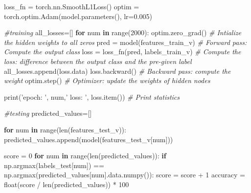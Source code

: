 \documentclass[11pt]{article}
\newenvironment{Shaded}{}{}
\newcommand{\KeywordTok}[1]{\textcolor[rgb]{0.00,0.44,0.13}{\textbf{{#1}}}}
\newcommand{\DecValTok}[1]{\textcolor[rgb]{0.25,0.63,0.44}{{#1}}}
\newcommand{\FloatTok}[1]{\textcolor[rgb]{0.25,0.63,0.44}{{#1}}}
\newcommand{\StringTok}[1]{\textcolor[rgb]{0.25,0.44,0.63}{{#1}}}
\newcommand{\CommentTok}[1]{\textcolor[rgb]{0.38,0.63,0.69}{\textit{{#1}}}}
\newcommand{\NormalTok}[1]{{#1}}
\newcommand{\ControlFlowTok}[1]{\textcolor[rgb]{0.00,0.44,0.13}{\textbf{{#1}}}}
\newcommand{\OperatorTok}[1]{\textcolor[rgb]{0.40,0.40,0.40}{{#1}}}
\newcommand{\BuiltInTok}[1]{{#1}}
\begin{document}
\begin{Shaded}
\begin{Highlighting}[]
\NormalTok{        loss_fn }\OperatorTok{=}\NormalTok{ torch.nn.SmoothL1Loss()}
\NormalTok{        optim }\OperatorTok{=}\NormalTok{ torch.optim.Adam(model.parameters(), lr}\OperatorTok{=}\FloatTok{0.005}\NormalTok{)}
        
        \CommentTok{#training}
\NormalTok{        all_losses}\OperatorTok{=}\NormalTok{[]}
        \ControlFlowTok{for}\NormalTok{ num }\KeywordTok{in} \BuiltInTok{range}\NormalTok{(}\DecValTok{2000}\NormalTok{):}
\NormalTok{            optim.zero_grad()                                 }\CommentTok{# Intialize the hidden weights to all zeros}
\NormalTok{            pred }\OperatorTok{=}\NormalTok{ model(features_train_v)                    }\CommentTok{# Forward pass: Compute the output class}
\NormalTok{            loss }\OperatorTok{=}\NormalTok{ loss_fn(pred, labels_train_v)              }\CommentTok{# Compute the loss: difference between the output class and                                                                      the pre-given label}
\NormalTok{            all_losses.append(loss.data)}
\NormalTok{            loss.backward()                                   }\CommentTok{# Backward pass: compute the weight}
\NormalTok{            optim.step()                                      }\CommentTok{# Optimizer: update the weights of hidden nodes}
            
            \BuiltInTok{print}\NormalTok{(}\StringTok{'epoch: '}\NormalTok{, num,}\StringTok{' loss: '}\NormalTok{, loss.item())      }\CommentTok{# Print statistics       }
            
        \CommentTok{#testing}
\NormalTok{        predicted_values}\OperatorTok{=}\NormalTok{[]}
    
        \ControlFlowTok{for}\NormalTok{ num }\KeywordTok{in} \BuiltInTok{range}\NormalTok{(}\BuiltInTok{len}\NormalTok{(features_test_v)):}
\NormalTok{            predicted_values.append(model(features_test_v[num]))}
        
\NormalTok{        score }\OperatorTok{=} \DecValTok{0}
        \ControlFlowTok{for}\NormalTok{ num }\KeywordTok{in} \BuiltInTok{range}\NormalTok{(}\BuiltInTok{len}\NormalTok{(predicted_values)):}
            \ControlFlowTok{if}\NormalTok{ np.argmax(labels_test[num]) }\OperatorTok{==}\NormalTok{ np.argmax(predicted_values[num].data.numpy()):}
\NormalTok{                score }\OperatorTok{=}\NormalTok{ score }\OperatorTok{+} \DecValTok{1}     
\NormalTok{        accuracy }\OperatorTok{=} \BuiltInTok{float}\NormalTok{(score }\OperatorTok{/} \BuiltInTok{len}\NormalTok{(predicted_values)) }\OperatorTok{*} \DecValTok{100}
        

\end{Highlighting}
\end{Shaded}
\end{document}
